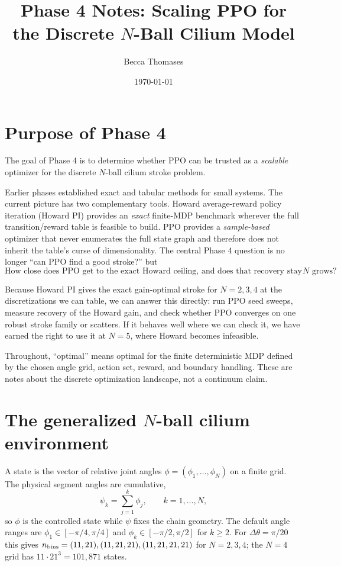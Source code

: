 \documentclass[11pt]{article}
\title{Phase 4 Notes: Scaling PPO for the Discrete $N$-Ball Cilium Model}
\author{Becca Thomases}
\date{\today}
\begin{document}
\maketitle

\section{Purpose of Phase 4}

The goal of Phase 4 is to determine whether PPO can be trusted as a
\emph{scalable} optimizer for the discrete $N$-ball cilium stroke problem.

Earlier phases established exact and tabular methods for small systems. The
current picture has two complementary tools. Howard average-reward policy
iteration (Howard PI) provides an \emph{exact} finite-MDP benchmark wherever
the full transition/reward table is feasible to build. PPO provides a
\emph{sample-based} optimizer that never enumerates the full state graph and
therefore does not inherit the table's curse of dimensionality. The central
Phase 4 question is no longer ``can PPO find a good stroke?'' but
\[
    \text{How close does PPO get to the exact Howard ceiling, and does that
    recovery stay reliable as } N \text{ grows?}
\]

Because Howard PI gives the exact gain-optimal stroke for $N=2,3,4$ at the
discretizations we can table, we can answer this directly: run PPO seed sweeps,
measure recovery of the Howard gain, and check whether PPO converges on one
robust stroke family or scatters. If it behaves well where we can check it, we
have earned the right to use it at $N=5$, where Howard becomes infeasible.

Throughout, ``optimal'' means optimal for the finite deterministic MDP defined
by the chosen angle grid, action set, reward, and boundary handling. These are
notes about the discrete optimization landscape, not a continuum claim.

\section{The generalized $N$-ball cilium environment}

A state is the vector of relative joint angles $\phi=(\phi_1,\ldots,\phi_N)$ on
a finite grid. The physical segment angles are cumulative,
\[
    \psi_k = \sum_{j=1}^k \phi_j, \qquad k=1,\ldots,N,
\]
so $\phi$ is the controlled state while $\psi$ fixes the chain geometry. The
default angle ranges are $\phi_1\in[-\pi/4,\pi/4]$ and
$\phi_k\in[-\pi/2,\pi/2]$ for $k\ge 2$. For $\Delta\theta=\pi/20$ this gives
$n_{\rm bins}=(11,21),(11,21,21),(11,21,21,21)$ for $N=2,3,4$; the $N=4$ grid
has $11\cdot 21^3 = 101{,}871$ states.
\end{document}
